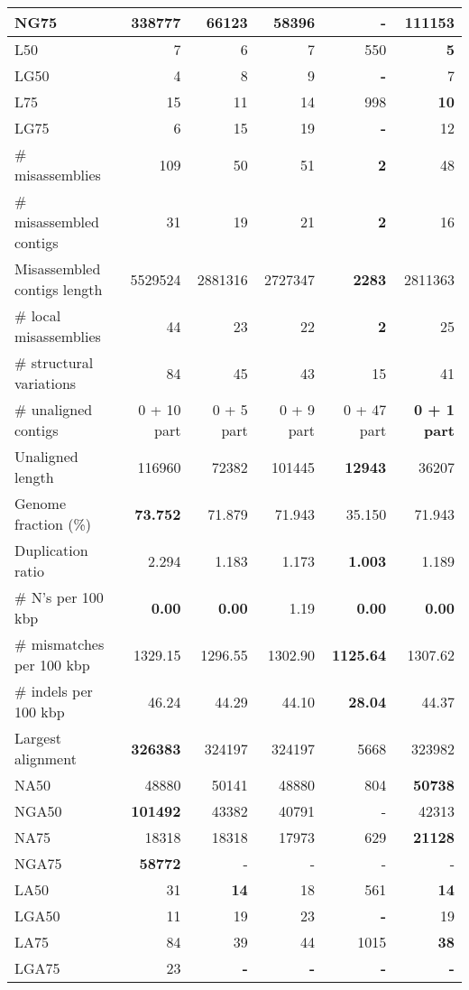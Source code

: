 \documentclass[12pt,a4paper]{article}
\begin{document}
\begin{table}[ht]
\begin{center}
\begin{tabular}{|l*{5}{|r}|}
NG75 & {\bf 338777} & 66123 & 58396 & - & 111153 \\ \hline
L50 & 7 & 6 & 7 & 550 & {\bf 5} \\ \hline
LG50 & 4 & 8 & 9 & {\bf -} & 7 \\ \hline
L75 & 15 & 11 & 14 & 998 & {\bf 10} \\ \hline
LG75 & 6 & 15 & 19 & {\bf -} & 12 \\ \hline
\# misassemblies & 109 & 50 & 51 & {\bf 2} & 48 \\ \hline
\# misassembled contigs & 31 & 19 & 21 & {\bf 2} & 16 \\ \hline
Misassembled contigs length & 5529524 & 2881316 & 2727347 & {\bf 2283} & 2811363 \\ \hline
\# local misassemblies & 44 & 23 & 22 & {\bf 2} & 25 \\ \hline
\# structural variations & 84 & 45 & 43 & 15 & 41 \\ \hline
\# unaligned contigs & 0 + 10 part & 0 + 5 part & 0 + 9 part & 0 + 47 part & {\bf 0 + 1 part} \\ \hline
Unaligned length & 116960 & 72382 & 101445 & {\bf 12943} & 36207 \\ \hline
Genome fraction (\%) & {\bf 73.752} & 71.879 & 71.943 & 35.150 & 71.943 \\ \hline
Duplication ratio & 2.294 & 1.183 & 1.173 & {\bf 1.003} & 1.189 \\ \hline
\# N's per 100 kbp & {\bf 0.00} & {\bf 0.00} & 1.19 & {\bf 0.00} & {\bf 0.00} \\ \hline
\# mismatches per 100 kbp & 1329.15 & 1296.55 & 1302.90 & {\bf 1125.64} & 1307.62 \\ \hline
\# indels per 100 kbp & 46.24 & 44.29 & 44.10 & {\bf 28.04} & 44.37 \\ \hline
Largest alignment & {\bf 326383} & 324197 & 324197 & 5668 & 323982 \\ \hline
NA50 & 48880 & 50141 & 48880 & 804 & {\bf 50738} \\ \hline
NGA50 & {\bf 101492} & 43382 & 40791 & - & 42313 \\ \hline
NA75 & 18318 & 18318 & 17973 & 629 & {\bf 21128} \\ \hline
NGA75 & {\bf 58772} & - & - & - & - \\ \hline
LA50 & 31 & {\bf 14} & 18 & 561 & {\bf 14} \\ \hline
LGA50 & 11 & 19 & 23 & {\bf -} & 19 \\ \hline
LA75 & 84 & 39 & 44 & 1015 & {\bf 38} \\ \hline
LGA75 & 23 & {\bf -} & {\bf -} & {\bf -} & {\bf -} \\ \hline
\end{tabular}
\end{center}
\end{table}
\end{document}
